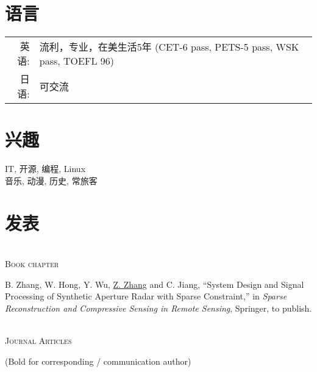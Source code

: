 \documentclass[paper=a4,fontsize=11pt]{scrartcl}
\begin{document}

\section*{语言}

\begin{tabular}{rl}

\textsc{英语:} & 流利，专业，在美生活5年 (CET-6 pass, PETS-5 pass, WSK pass, TOEFL 96) \\

\textsc{日语:} & 可交流\\
\end{tabular}


\section*{兴趣}

IT, 开源, 编程, Linux\\
音乐, 动漫, 历史, 常旅客


\section*{发表}

~\\

\textsc{Book chapter}

\begin{description}
\item B. Zhang, W. Hong, Y. Wu, \underline{Z. Zhang} and C. Jiang, ``System Design and Signal Processing of Synthetic Aperture Radar with Sparse Constraint,'' in \textit{Sparse Reconstruction and Compressive Sensing in Remote Sensing}, Springer, to publish.
\end{description}

~\\

\textsc{Journal Articles}

(Bold for corresponding / communication author)
\end{document}
